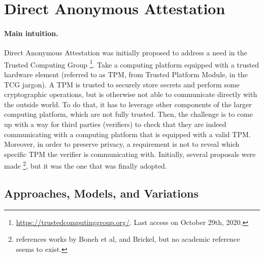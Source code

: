 \section{Direct Anonymous Attestation}
\label{sec:daa}


\paragraph{Main intuition.}
%
Direct Anonymous Attestation \cite{bcc04} was initially proposed to address a
need in the Trusted Computing Group
\footnote{\url{https://trustedcomputinggroup.org/}. Last access on October 29th,
  2020.}. Take a computing platform equipped with a trusted hardware element
(referred to as TPM, from Trusted Platform Module, in the TCG jargon). A TPM
is trusted to securely store secrets and perform some cryptographic operations,
but is otherwise not able to communicate directly with the outside world. To
do that, it has to leverage other components of the larger computing platform,
which are not fully trusted. Then, the challenge is to come up with a way for
third parties (verifiers) to check that they are indeed communicating with a
computing platform that is equipped with a valid TPM. Moreover, in order to
preserve privacy, a requirement is not to reveal which specific TPM the
verifier is communicating with. Initially, several proposals were made
\needcite\footnote{\cite{bcc04} references works by Boneh et al, and Brickel,
  but no academic reference seems to exist.}, but it was \cite{bcc04} the one
that was finally adopted.

\subsection{Approaches, Models, and Variations}
\label{ssec:daaapproach}

